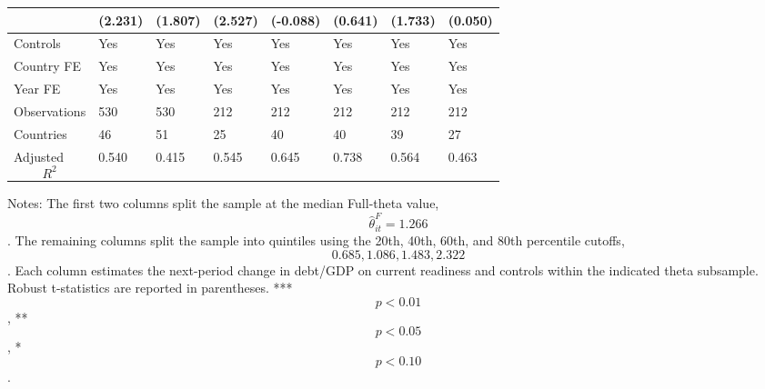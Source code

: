 \begin{table}[H]
\begin{threeparttable}
\begin{tabularx}{\textwidth}{lYYYYYYY}
  & (2.231) & (1.807) & (2.527) & (-0.088) & (0.641) & (1.733) & (0.050) \\
\midrule
Controls & Yes & Yes & Yes & Yes & Yes & Yes & Yes \\
Country FE & Yes & Yes & Yes & Yes & Yes & Yes & Yes \\
Year FE & Yes & Yes & Yes & Yes & Yes & Yes & Yes \\
Observations & 530 & 530 & 212 & 212 & 212 & 212 & 212 \\
Countries & 46 & 51 & 25 & 40 & 40 & 39 & 27 \\
Adjusted $$R^2$$ & 0.540 & 0.415 & 0.545 & 0.645 & 0.738 & 0.564 & 0.463 \\
\bottomrule
\end{tabularx}
\begin{tablenotes}[flushleft]\footnotesize
\item Notes: The first two columns split the sample at the median Full-theta value, $$\widehat{\theta}^{F}_{it}=1.266$$. The remaining columns split the sample into quintiles using the 20th, 40th, 60th, and 80th percentile cutoffs, $$0.685, 1.086, 1.483, 2.322$$. Each column estimates the next-period change in debt/GDP on current readiness and controls within the indicated theta subsample. Robust t-statistics are reported in parentheses. *** $$p<0.01$$, ** $$p<0.05$$, * $$p<0.10$$.
\end{tablenotes}
\end{threeparttable}
\end{table}
